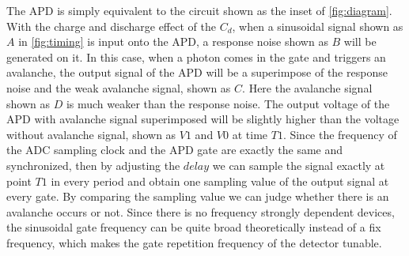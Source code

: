 \documentclass[%
 reprint,
superscriptaddress,
 amsmath,amssymb,
 aps,
]{revtex4-1}
\begin{document}
The APD is simply equivalent to the circuit shown as the inset of \autoref{fig:diagram}\cite{SCova-photodiodes1996}. %
With the charge and discharge effect of the $C_d$, when a sinusoidal signal shown as $A$ in \autoref{fig:timing} is input onto the APD, a response noise shown as $B$ will be generated on it. In this case, when a photon comes in the gate and triggers an avalanche, the output signal of the APD will be a superimpose of the response noise and the weak avalanche signal, shown as $C$. Here the avalanche signal shown as $D$ is much weaker than the response noise. The output voltage of the APD with avalanche signal superimposed will be slightly higher than the voltage without avalanche signal, shown as ${V1}$ and ${V0}$ at time ${T1}$. %
Since the frequency of the ADC sampling clock and the APD gate are exactly the same and synchronized, then by adjusting the $delay$ we can sample the signal exactly at point ${T1}$ in every period and obtain one sampling value of the output signal at every gate. By comparing the sampling value we can judge whether there is an avalanche occurs or not. Since there is no frequency strongly dependent devices, the sinusoidal gate frequency can be quite broad theoretically instead of a fix frequency, which makes the gate repetition frequency of the detector tunable.
\end{document}
